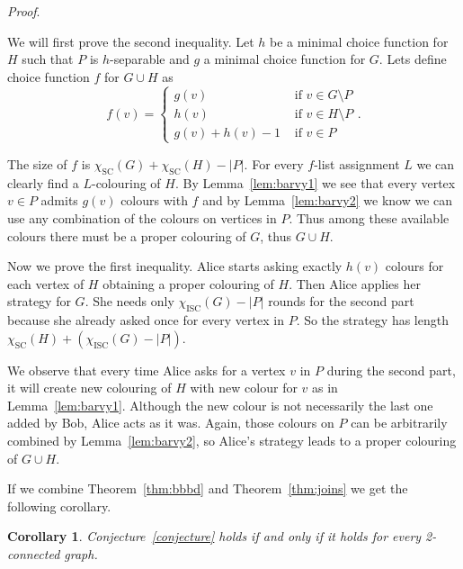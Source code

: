\documentclass[11pt,a4paper]{article}
\theoremstyle{plain}
\newtheorem*{cor}{Corollary}
\newenvironment{pf}{
  \par\medskip\noindent
  \textit{Proof}.
}{
\newline
\rightline{$\square$}  %
}
\theoremstyle{definition}
\theoremstyle{remark}
\newcommand{\scn}{\chi_\text{SC}}
\newcommand{\iscn}{\chi_\text{ISC}}
\begin{document}
\begin{pf}
We will first prove the second inequality. Let $h$ be a minimal choice function for $H$ such that $P$ is $h$-separable and $g$ a minimal choice function for $G$. Lets define choice function $f$ for $G\cup H$ as
$$
f(v) = \begin{cases}
g(v) & \text{ if } v\in G\setminus P \\
h(v) & \text{ if } v\in H\setminus P \\
g(v)+h(v)-1 & \text{ if } v\in P
\end{cases}.$$

The size of $f$ is $\scn(G) + \scn(H) - |P|$. For every $f$-list assignment $L$ we can clearly find a $L$-colouring of $H$. By Lemma~\ref{lem:barvy1} we see that every vertex $v\in P$ admits $g(v)$ colours with $f$ and by Lemma~\ref{lem:barvy2} we know we can use any combination of the colours on vertices in $P$. Thus among these available colours there must be a proper colouring of $G$, thus $G \cup H$.

Now we prove the first inequality. Alice starts asking exactly $h(v)$ colours for each vertex of $H$ obtaining a proper colouring of $H$. Then Alice applies her strategy for $G$. She needs only $\iscn(G)-|P|$ rounds for the second part because she already asked once for every vertex in $P$. So the strategy has length $\scn(H) + (\iscn(G)-|P|)$. 

We observe that every time Alice asks for a vertex $v$ in $P$ during the second part, it will create new colouring of $H$ with new colour for $v$ as in Lemma~\ref{lem:barvy1}. Although the new colour is not necessarily the last one added by Bob, Alice acts as it was. Again, those colours on $P$ can be arbitrarily combined by Lemma~\ref{lem:barvy2}, so Alice's strategy leads to a proper colouring of $G\cup H$.
\end{pf}

If we combine Theorem~\ref{thm:bbbd} and Theorem~\ref{thm:joins} we get the following corollary.

\begin{cor}
Conjecture~\ref{conjecture} holds if and only if it holds for every 2-connected graph.
\end{cor}
\end{document}
